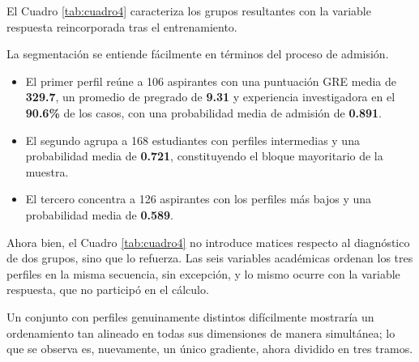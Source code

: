 \documentclass[
  10pt,
  a4paper]{article}
\providecommand{\tightlist}{%
  \setlength{\itemsep}{0pt}\setlength{\parskip}{0pt}}
\begin{document}
El Cuadro \ref{tab:cuadro4} caracteriza los grupos resultantes con la variable respuesta reincorporada tras el entrenamiento.

\vspace{0.3cm}

\begin{table}[!h]
\centering
\caption{\label{tab:cuadro4}Caracterización de los tres perfiles con la variable respuesta reincorporada.}
\centering
{}
\end{table}

\vspace{0.3cm}

La segmentación se entiende fácilmente en términos del proceso de admisión.

\begin{itemize}
\tightlist
\item
  El primer perfil reúne a 106 aspirantes con una puntuación GRE media de \textbf{329.7}, un promedio de pregrado de \textbf{9.31} y experiencia investigadora en el \textbf{90.6\%} de los casos, con una probabilidad media de admisión de \textbf{0.891}.
\item
  El segundo agrupa a 168 estudiantes con perfiles intermedias y una probabilidad media de \textbf{0.721}, constituyendo el bloque mayoritario de la muestra.
\item
  El tercero concentra a 126 aspirantes con los perfiles más bajos y una probabilidad media de \textbf{0.589}.
\end{itemize}

Ahora bien, el Cuadro \ref{tab:cuadro4} no introduce matices respecto al diagnóstico de dos grupos, sino que lo refuerza. Las seis variables académicas ordenan los tres perfiles en la misma secuencia, sin excepción, y lo mismo ocurre con la variable respuesta, que no participó en el cálculo.

Un conjunto con perfiles genuinamente distintos difícilmente mostraría un ordenamiento tan alineado en todas sus dimensiones de manera simultánea; lo que se observa es, nuevamente, un único gradiente, ahora dividido en tres tramos.
\end{document}
